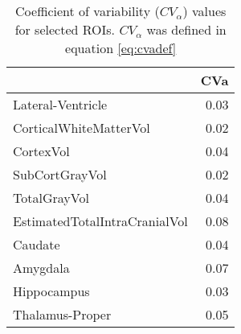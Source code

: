 \begin{table}
[]
\centering
\begin{tabular}{lr}
\toprule
{} &   CVa \\
\midrule
Lateral-Ventricle             &  0.03 \\
CorticalWhiteMatterVol        &  0.02 \\
CortexVol                     &  0.04 \\
SubCortGrayVol                &  0.02 \\
TotalGrayVol                  &  0.04 \\
EstimatedTotalIntraCranialVol &  0.08 \\
Caudate                       &  0.04 \\
Amygdala                      &  0.07 \\
Hippocampus                   &  0.03 \\
Thalamus-Proper               &  0.05 \\
\bottomrule
\end{tabular}
\caption{Coefficient of variability ($CV_{\alpha}$) values for selected ROIs. $CV_{\alpha}$ was defined in equation \ref{eq:cvadef}}
\label{tab:cva} 
\end{table}